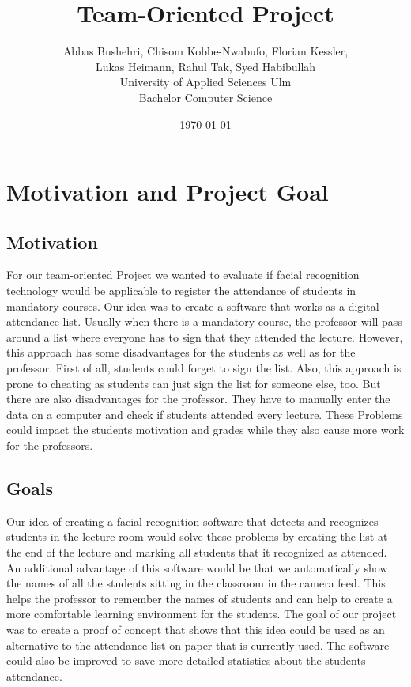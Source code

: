 \documentclass[12pt, a4paper]{article}
\title{Team-Oriented Project}
\author{Abbas Bushehri, Chisom Kobbe-Nwabufo, Florian Kessler,\\
	Lukas Heimann, Rahul Tak, Syed Habibullah \\
	University of Applied Sciences Ulm  \\
	Bachelor Computer Science 
	}
\date{\today}
\begin{document}
\maketitle




\newpage



\tableofcontents



\newpage

\section{Motivation and Project Goal}
\subsection{Motivation}
For our team-oriented Project we wanted to evaluate if facial recognition technology would be applicable to register the attendance of students in mandatory courses. Our idea was to create a software that works as a digital attendance list. Usually when there is a mandatory course, the professor will pass around a list where everyone has to sign that they attended the lecture. However, this approach has some disadvantages for the students as well as for the professor. First of all, students could forget to sign the list. Also, this approach is prone to cheating as students can just sign the list for someone else, too. But there are also disadvantages for the professor. They have to manually enter the data on a computer and check if students attended every lecture. These Problems could impact the students motivation and grades while they also cause more work for the professors. 

\subsection{Goals}
Our idea of creating a facial recognition software that detects and recognizes students in the lecture room would solve these problems by creating the list at the end of the lecture and marking all students that it recognized as attended. An additional advantage of this software would be that we automatically show the names of all the students sitting in the classroom in the camera feed. This helps the professor to remember the names of students and can help to create a more comfortable learning environment for the students. The goal of our project was to create a proof of concept that shows that this idea could be used as an alternative to the attendance list on paper that is currently used. The software could also be improved to save more detailed statistics about the students attendance. 
\end{document}
